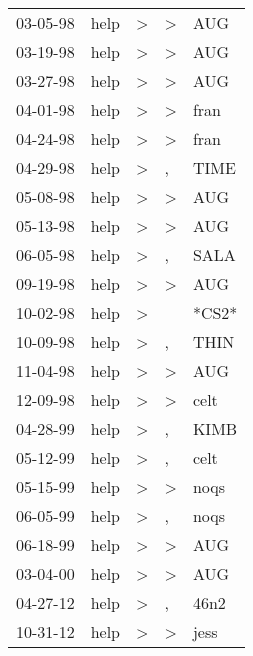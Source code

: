 \begin{supertabular}{lllll}
 03-05-98 &  help &  \textgreater &  \textgreater &    AUG \\
 03-19-98 &  help &  \textgreater &  \textgreater &    AUG \\
 03-27-98 &  help &  \textgreater &  \textgreater &    AUG \\
 04-01-98 &  help &  \textgreater &  \textgreater &   fran \\
 04-24-98 &  help &  \textgreater &  \textgreater &   fran \\
 04-29-98 &  help &  \textgreater &             , &   TIME \\
 05-08-98 &  help &  \textgreater &  \textgreater &    AUG \\
 05-13-98 &  help &  \textgreater &  \textgreater &    AUG \\
 06-05-98 &  help &  \textgreater &             , &   SALA \\
 09-19-98 &  help &  \textgreater &  \textgreater &    AUG \\
 10-02-98 &  help &  \textgreater &               &  *CS2* \\
 10-09-98 &  help &  \textgreater &             , &   THIN \\
 11-04-98 &  help &  \textgreater &  \textgreater &    AUG \\
 12-09-98 &  help &  \textgreater &  \textgreater &   celt \\
 04-28-99 &  help &  \textgreater &             , &   KIMB \\
 05-12-99 &  help &  \textgreater &             , &   celt \\
 05-15-99 &  help &  \textgreater &  \textgreater &   noqs \\
 06-05-99 &  help &  \textgreater &             , &   noqs \\
 06-18-99 &  help &  \textgreater &  \textgreater &    AUG \\
 03-04-00 &  help &  \textgreater &  \textgreater &    AUG \\
 04-27-12 &  help &  \textgreater &             , &   46n2 \\
 10-31-12 &  help &  \textgreater &  \textgreater &   jess \\
\end{supertabular}
